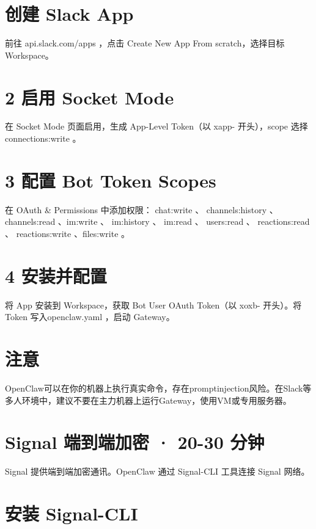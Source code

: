 \documentclass[
  10
]{article}
\begin{document}
\section{创建 Slack App}\label{ux521bux5efa-slack-app}

前往 api.slack.com/apps ，点击 Create New App From scratch，选择目标
Workspace。

\section{2 启用 Socket Mode}\label{ux542fux7528-socket-mode}

在 Socket Mode 页面启用，生成 App-Level Token（以 xapp- 开头），scope
选择connections:write 。

\section{3 配置 Bot Token Scopes}\label{ux914dux7f6e-bot-token-scopes}

在 OAuth \& Permissions 中添加权限： chat:write 、 channels:history 、
channels:read 、im:write 、 im:history 、 im:read 、 users:read 、
reactions:read 、 reactions:write 、files:write 。

\section{4 安装并配置}\label{ux5b89ux88c5ux5e76ux914dux7f6e}

将 App 安装到 Workspace，获取 Bot User OAuth Token（以 xoxb- 开头）。将
Token 写入openclaw.yaml ，启动 Gateway。

\section{注意}\label{ux6ce8ux610f-7}

OpenClaw可以在你的机器上执行真实命令，存在promptinjection风险。在Slack等多人环境中，建议不要在主力机器上运行Gateway，使用VM或专用服务器。

\section{Signal 端到端加密 · 20-30
分钟}\label{signal-ux7aefux5230ux7aefux52a0ux5bc6-20-30-ux5206ux949f}

Signal 提供端到端加密通讯。OpenClaw 通过 Signal-CLI 工具连接 Signal
网络。

\section{安装 Signal-CLI}\label{ux5b89ux88c5-signal-cli}
\end{document}
